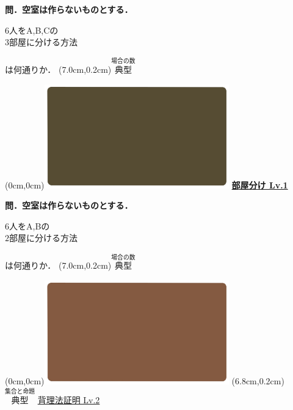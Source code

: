 \documentclass[10pt,
fleqn,
dvipdfmx,
uplatex
]{jsarticle}
\begin{document}
\large 
\bf\boldmath 問．空室は作らないものとする．

\Huge
\vspace{-0.3zw}
\hspace{0.1zw} $6$人をA,\;B,\;Cの\vspace{-0.2zw}\\
\hfill$3$部屋に分ける方法\hspace{0.1zw} 

\large
\vspace{0.1zw}
\hfill は何通りか．
\at(7.0cm,0.2cm){\small\color{bradorange}$\overset{\text{場合の数}}{\text{典型}}$}

\newpage

\at(0cm,0cm){\includegraphics[width=8cm,bb=0 0 1920 1080]{./youtube/thumbnails/templates/smart_background/場合の数.jpeg}}
{\color{orange}\bf\boldmath\huge\underline{部屋分け Lv.1 }}\vspace{0.3zw}

\large 
\bf\boldmath 問．空室は作らないものとする．

\Huge
\vspace{-0.3zw}
\hspace{0.1zw} $6$人をA,\;Bの\vspace{-0.2zw}\\
\hfill$2$部屋に分ける方法\hspace{0.1zw} 

\large
\vspace{0.1zw}
\hfill は何通りか．
\at(7.0cm,0.2cm){\small\color{bradorange}$\overset{\text{場合の数}}{\text{典型}}$}



\newpage



\at(0cm,0cm){\includegraphics[width=8cm,bb=0 0 1920 1080]{./youtube/thumbnails/templates/smart_background/集合と命題.jpeg}}
\at(6.8cm,0.2cm){\small\color{bradorange}$\overset{\text{集合と命題}}{\text{典型}}$}
{\color{orange}\LARGE\underline{背理法証明 Lv.2 }}\vspace{0.3zw}
\end{document}

